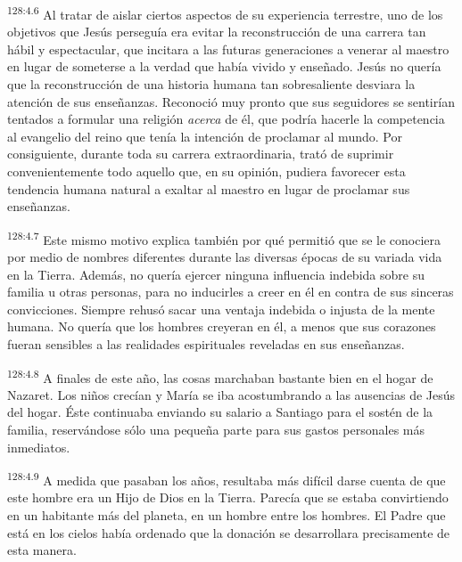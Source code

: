 \par 
\textsuperscript{128:4.6} Al tratar de aislar ciertos aspectos de su experiencia terrestre, uno de los objetivos que Jesús perseguía era evitar la reconstrucción de una carrera tan hábil y espectacular, que incitara a las futuras generaciones a venerar al maestro en lugar de someterse a la verdad que había vivido y enseñado. Jesús no quería que la reconstrucción de una historia humana tan sobresaliente desviara la atención de sus enseñanzas. Reconoció muy pronto que sus seguidores se sentirían tentados a formular una religión \textit{acerca} de él, que podría hacerle la competencia al evangelio del reino que tenía la intención de proclamar al mundo. Por consiguiente, durante toda su carrera extraordinaria, trató de suprimir convenientemente todo aquello que, en su opinión, pudiera favorecer esta tendencia humana natural a exaltar al maestro en lugar de proclamar sus enseñanzas.

\par 
\textsuperscript{128:4.7} Este mismo motivo explica también por qué permitió que se le conociera por medio de nombres diferentes durante las diversas épocas de su variada vida en la Tierra. Además, no quería ejercer ninguna influencia indebida sobre su familia u otras personas, para no inducirles a creer en él en contra de sus sinceras convicciones. Siempre rehusó sacar una ventaja indebida o injusta de la mente humana. No quería que los hombres creyeran en él, a menos que sus corazones fueran sensibles a las realidades espirituales reveladas en sus enseñanzas.

\par 
\textsuperscript{128:4.8} A finales de este año, las cosas marchaban bastante bien en el hogar de Nazaret. Los niños crecían y María se iba acostumbrando a las ausencias de Jesús del hogar. Éste continuaba enviando su salario a Santiago para el sostén de la familia, reservándose sólo una pequeña parte para sus gastos personales más inmediatos.

\par 
\textsuperscript{128:4.9} A medida que pasaban los años, resultaba más difícil darse cuenta de que este hombre era un Hijo de Dios en la Tierra. Parecía que se estaba convirtiendo en un habitante más del planeta, en un hombre entre los hombres. El Padre que está en los cielos había ordenado que la donación se desarrollara precisamente de esta manera.

